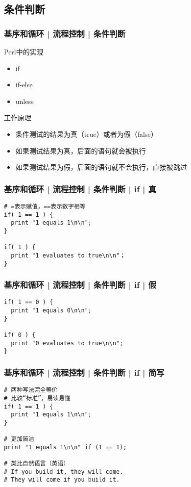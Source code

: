 \subsection{条件判断}
\begin{frame}
  \frametitle{基序和循环 | 流程控制 | 条件判断}
  \begin{block}{\alert{Perl中的实现}}
    \begin{itemize}
      \item if
      \item if-else
      \item unless
    \end{itemize}
  \end{block}
  \pause
  \begin{block}{工作原理}
    \begin{itemize}
      \item 条件测试的结果为真（true）或者为假（false）
      \item 如果测试结果为真，后面的语句就会被执行
      \item 如果测试结果为假，后面的语句就不会执行，直接被跳过
    \end{itemize}
  \end{block}
\end{frame}

\begin{frame}[fragile]
  \frametitle{基序和循环 | 流程控制 | 条件判断 | \alert{if} | 真}
\begin{lstlisting}
# =表示赋值，==表示数字相等
if( 1 == 1 ) {
  print "1 equals 1\n\n";
}

if( 1 ) {
  print "1 evaluates to true\n\n"；
}
\end{lstlisting}
\end{frame}

\begin{frame}[fragile]
  \frametitle{基序和循环 | 流程控制 | 条件判断 | \alert{if} | 假}
\begin{lstlisting}
if( 1 == 0 ) {
  print "1 equals 0\n\n";
}

if( 0 ) {
  print "0 evaluates to true\n\n";
}
\end{lstlisting}
\end{frame}

\begin{frame}[fragile]
  \frametitle{基序和循环 | 流程控制 | 条件判断 | if | \alert{简写}}
\begin{lstlisting}
# 两种写法完全等价
# 比较“标准”，易读易懂
if( 1 == 1 ) {
  print "1 equals 1\n\n";
}

# 更加简洁
print "1 equals 1\n\n" if (1 == 1);

# 类比自然语言（英语）
# If you build it, they will come.
# They will come if you build it.
\end{lstlisting}
\end{frame}
    
